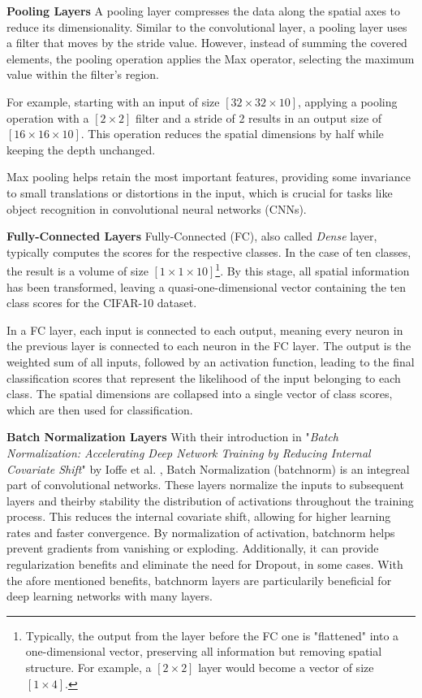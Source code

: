 \textbf{Pooling Layers}\label{theoretical_classification_pooling_layers}
A pooling layer compresses the data along the spatial axes to reduce its dimensionality. Similar to the convolutional layer, a pooling layer uses a filter that moves by the stride value. However, instead of summing the covered elements, the pooling operation applies the Max operator, selecting the maximum value within the filter's region.

For example, starting with an input of size $[32 \times 32 \times 10]$, applying a pooling operation with a $[2 \times 2]$ filter and a stride of 2 results in an output size of $[16 \times 16 \times 10]$. This operation reduces the spatial dimensions by half while keeping the depth unchanged.

Max pooling helps retain the most important features, providing some invariance to small translations or distortions in the input, which is crucial for tasks like object recognition in convolutional neural networks (CNNs).


\vspace{1em}

\textbf{Fully-Connected Layers}\label{theoretical_classification_fully_connected_layers}
Fully-Connected (FC), also called \textit{Dense} layer, typically computes the scores for the respective classes. In the case of ten classes, the result is a volume of size $[1 \times 1 \times 10]$\footnote{Typically, the output from the layer before the FC one is "flattened" into a one-dimensional vector, preserving all information but removing spatial structure. For example, a $[2 \times 2]$ layer would become a vector of size $[1 \times 4]$.}. By this stage, all spatial information has been transformed, leaving a quasi-one-dimensional vector containing the ten class scores for the CIFAR-10 dataset.

In a FC layer, each input is connected to each output, meaning every neuron in the previous layer is connected to each neuron in the FC layer. The output is the weighted sum of all inputs, followed by an activation function, leading to the final classification scores that represent the likelihood of the input belonging to each class. The spatial dimensions are collapsed into a single vector of class scores, which are then used for classification.

\textbf{Batch Normalization Layers}\label{theoretical_classification_batchnorm_layers}
With their introduction in "\textit{Batch Normalization: Accelerating Deep Network Training by Reducing Internal Covariate Shift}" by Ioffe et al. \cite{ioffe2015batchnormalizationacceleratingdeep}, Batch Normalization (batchnorm) is an integreal part of convolutional networks. These layers normalize the inputs to subsequent layers and theirby stability the distribution of activations throughout the training process. This reduces the internal covariate shift, allowing for higher learning rates and faster convergence. By normalization of activation, batchnorm helps prevent gradients from vanishing or exploding. Additionally, it can provide regularization benefits and eliminate the need for Dropout, in some cases. With the afore mentioned benefits, batchnorm layers are particularily beneficial for deep learning networks with many layers.


